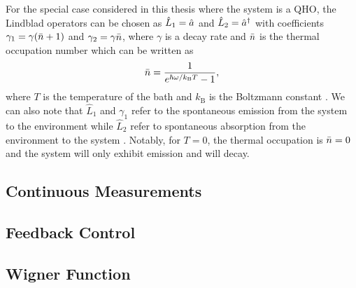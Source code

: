 For the special case considered in this thesis where the system is a QHO, the Lindblad operators can be chosen as $\hat{L}_1 = \hat{a}$ and $\hat{L}_2 = \hat{a}^{\dagger}$ with coefficients $\gamma_1 = \gamma(\bar{n} + 1)$ and $\gamma_2 = \gamma \bar{n}$, where $\gamma$ is a decay rate and $\bar{n}$ is the thermal occupation number which can be written as 
\begin{equation}
    \bar{n} = \frac{1}{e^{\hbar\omega/ k_\mathrm{B}T} - 1},
\end{equation}
where $T$ is the temperature of the bath and $k_\mathrm{B}$ is the Boltzmann constant \cite{Meystre:2021}. We can also note that $\hat{L}_1$ and $\gamma_1$ refer to the spontaneous emission from the system to the environment while $\hat{L}_2$ refer to spontaneous absorption from the environment to the system \cite{Meystre:2021}. Notably, for $T=0$, the thermal occupation is $\bar{n} = 0$ and the system will only exhibit emission and will decay.


\subsection{Continuous Measurements}
\subsection{Feedback Control}
\subsection{Wigner Function}